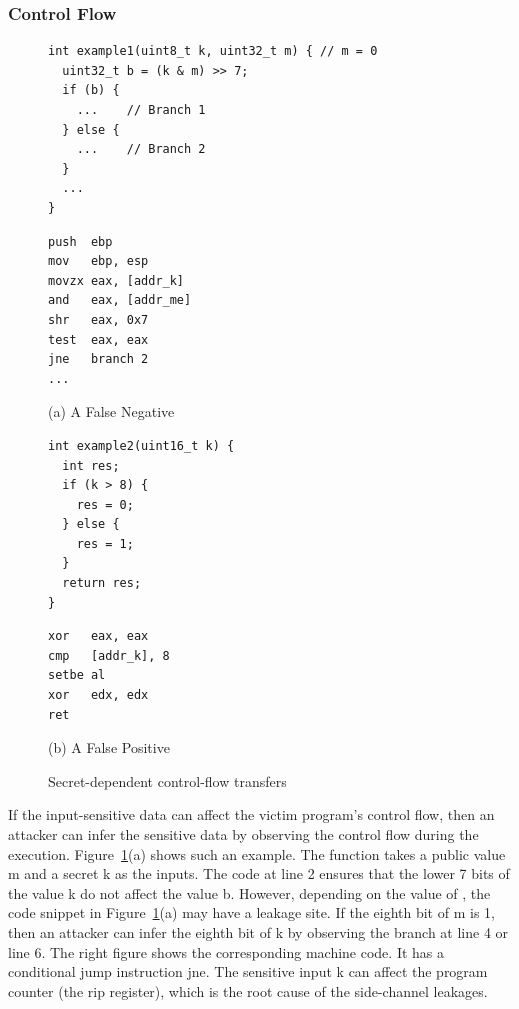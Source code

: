 \subsubsection{Control Flow}
\begin{figure}[ht]
  \begin{minipage}{0.45\linewidth}
    \begin{lstlisting}[xleftmargin=.15\textwidth, xrightmargin=.0\textwidth, frame=none]
int example1(uint8_t k, uint32_t m) { // m = 0
  uint32_t b = (k & m) >> 7;
  if (b) {
    ...    // Branch 1
  } else {
    ...    // Branch 2
  }
  ...
}
\end{lstlisting}
  \end{minipage}
  \hfill
  \begin{minipage}{0.45\linewidth}
    \begin{lstlisting}[xleftmargin=.15\textwidth, xrightmargin=.00\textwidth, frame=none, numbers=none, mathescape=true]
push  ebp
mov   ebp, esp
movzx eax, [addr_k]    
and   eax, [addr_me] 
shr   eax, 0x7           
test  eax, eax
jne   branch 2
...
\end{lstlisting}
  \end{minipage}\caption*{(a) A False Negative}

  \begin{minipage}{0.45\linewidth}
    \begin{lstlisting}[xleftmargin=.15\textwidth, xrightmargin=.0\textwidth, frame=none]
int example2(uint16_t k) {
  int res;
  if (k > 8) {
    res = 0;
  } else {
    res = 1;
  }
  return res;
}
\end{lstlisting}
  \end{minipage}
  \hfill
  \begin{minipage}{0.45\linewidth}
    \begin{lstlisting}[xleftmargin=.15\textwidth, xrightmargin=.00\textwidth, frame=none, numbers=none, mathescape=true]
xor   eax, eax
cmp   [addr_k], 8
setbe al
xor   edx, edx
ret
\end{lstlisting}
  \end{minipage}\caption*{(b) A False Positive}
  \caption{Secret-dependent control-flow transfers}\label{fig:chapter3:cf}
\end{figure}

If the input-sensitive data can affect the victim program's control flow, then an attacker can infer the sensitive data by observing the control flow during the execution. Figure~\ref{fig:chapter3:cf}(a) shows such an example. The function takes a public value \textsf{m} and a secret \textsf{k} as the inputs. The code at line 2 ensures that the lower 7 bits of the value \textsf{k} do not affect the value \textsf{b}. However, depending on the value of , the code snippet in Figure~\ref{fig:chapter3:cf}(a) may have a leakage site. If the eighth bit of \textsf{m} is 1, then an attacker can infer the eighth bit of \textsf{k} by observing the branch at line 4 or line 6. The right figure shows the corresponding machine code. It has a conditional jump instruction \textsf{jne}. The sensitive input \textsf{k} can affect the program counter (the rip register), which is the root cause of the side-channel leakages.

